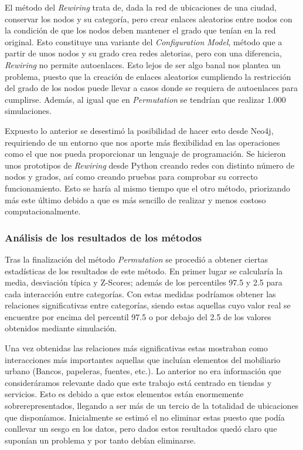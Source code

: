 El método del \textit{Rewiring} trata de, dada la red de ubicaciones de una ciudad, conservar los nodos y su categoría, pero crear enlaces aleatorios entre nodos con la condición de que los nodos deben mantener el grado que tenían en la red original. Esto constituye una variante del \textit{Configuration Model}, método que a partir de unos nodos y su grado crea redes aletorias, pero con una diferencia, \textit{Rewiring} no permite autoenlaces. Esto lejos de ser algo banal nos plantea un problema, puesto que la creación de enlaces aleatorios cumpliendo la restricción del grado de los nodos puede llevar a casos donde se requiera de autoenlaces para cumplirse. Además, al igual que en \textit{Permutation} se tendrían que realizar 1.000 simulaciones.

Expuesto lo anterior se desestimó la posibilidad de hacer esto desde Neo4j, requiriendo de un entorno que nos aporte más flexibilidad en las operaciones como el que nos pueda proporcionar un lenguaje de programación. Se hicieron unos prototipos de \textit{Rewiring} desde Python creando redes con distinto número de nodos y grados, así como creando pruebas para comprobar su correcto funcionamiento. Esto se haría al mismo tiempo que el otro método, priorizando más este último debido a que es más sencillo de realizar y menos costoso computacionalmente.


\subsubsection{Análisis de los resultados de los métodos}
Tras la finalización del método \textit{Permutation} se procedió a obtener ciertas estadísticas de los resultados de este método. En primer lugar se calcularía la media, desviación típica y Z-Scores; además de los percentiles 97.5 y 2.5 para cada interacción entre categorías. Con estas medidas podríamos obtener las relaciones significativas entre categorías, siendo estas aquellas cuyo valor real se encuentre por encima del percentil 97.5 o por debajo del 2.5 de los valores obtenidos mediante simulación.

Una vez obtenidas las relaciones más significativas estas mostraban como interacciones más importantes aquellas que incluían elementos del mobiliario urbano (Bancos, papeleras, fuentes, etc.). Lo anterior no era información que consideráramos relevante dado que este trabajo está centrado en tiendas y servicios. Esto es debido a que estos elementos están enormemente sobrerepresentados, llegando a ser más de un tercio de la totalidad de ubicaciones que disponíamos. Inicialmente se estimó el no eliminar estas puesto que podía conllevar un sesgo en los datos, pero dados estos resultados quedó claro que suponían un problema y por tanto debían eliminarse.

